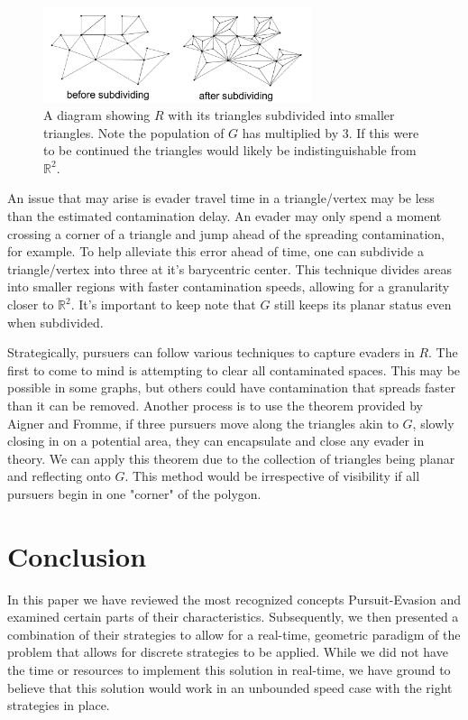 \documentclass{article}
\begin{document}
\begin{figure}[htb]
\centering
\includegraphics[width=0.7\textwidth]{"tesslation"}
\caption{A diagram showing \(R\) with its triangles subdivided into smaller triangles. Note the population of \(G\) has multiplied by 3. If this were to be continued the triangles would likely be indistinguishable from \(\mathbb{R}^2\).}
\end{figure}

An issue that may arise is evader travel time in a triangle/vertex may be less than the estimated contamination delay. An evader may only spend a moment crossing a corner of a triangle and jump ahead of the spreading contamination, for example. To help alleviate this error ahead of time, one can subdivide a triangle/vertex into three at it's barycentric center. This technique divides areas into smaller regions with faster contamination speeds, allowing for a granularity closer to \(\mathbb{R}^2\). It's important to keep note that \(G\) still keeps its planar status even when subdivided.

Strategically, pursuers can follow various techniques to capture evaders in \(R\). The first to come to mind is attempting to clear all contaminated spaces. This may be possible in some graphs, but others could have contamination that spreads faster than it can be removed. Another process is to use the theorem provided by Aigner and Fromme, if three pursuers move along the triangles akin to \(G\), slowly closing in on a potential area, they can encapsulate and close any evader in theory. We can apply this theorem due to the collection of triangles being planar and reflecting onto \(G\). This method would be irrespective of visibility if all pursuers begin in one "corner" of the polygon. 

\section{Conclusion}
In this paper we have reviewed the most recognized concepts Pursuit-Evasion and examined certain parts of their characteristics. Subsequently, we then presented a combination of their strategies to allow for a real-time, geometric paradigm of the problem that allows for discrete strategies to be applied. While we did not have the time or resources to implement this solution in real-time, we have ground to believe that this solution would work in an unbounded speed case with the right strategies in place.
\end{document}
